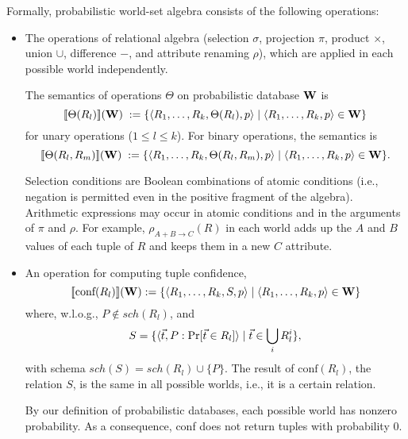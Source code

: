 Formally, probabilistic world-set algebra consists of the following operations:
\begin{itemize}
\item
The operations of relational algebra (selection $\sigma$, projection $\pi$,
product $\times$, union $\cup$, difference $-$, and attribute renaming $\rho$),
which are applied in each possible world independently.

The semantics of operations $\Theta$ on probabilistic database ${\bf W}$ is
%
\[
\lbrack\!\lbrack\Theta(R_l)\rbrack\!\rbrack({\bf W}) \; :=
\{ \langle R_1,\dots,R_k, \Theta(R_l), p \rangle
\mid \langle R_1,\dots,R_k, p \rangle \in {\bf W} \}
\]
for unary operations ($1 \le l \le k$). For binary operations, the semantics is
\[
\lbrack\!\lbrack\Theta(R_l, R_m)\rbrack\!\rbrack({\bf W}) \; :=
\{ \langle R_1,\dots,R_k, \Theta(R_l, R_m), p \rangle
\mid \langle R_1,\dots,R_k, p \rangle \in {\bf W} \}.
\]

Selection conditions are Boolean combinations of atomic
conditions (i.e., negation is permitted even in the positive fragment of the algebra).
Arithmetic expressions may occur
in atomic conditions and in the arguments of $\pi$ and $\rho$. For example,
$\rho_{A+B \rightarrow C}(R)$ in each world
adds up the $A$ and $B$ values of each tuple
of $R$ and keeps them in a new $C$ attribute.



\item
An operation for computing tuple confidence,
\[
\lbrack\!\lbrack\mbox{conf}(R_l)\rbrack\!\rbrack({\bf W}) :=
\{ \langle R_1,\dots,R_k, S, p \rangle \mid \langle R_1,\dots,R_k, p \rangle \in {\bf W} \}
\]
where, w.l.o.g., $P \not\in sch(R_l)$, and
\[
S = \{ \langle \vec{t}, P: \mbox{Pr}[\vec{t} \in R_l] \rangle \mid
   \vec{t} \in \bigcup_i R_l^i \},
\]
with schema $sch(S) = sch(R_l) \cup \{ P \}$.
%
%
The result of $\mbox{conf}(R_l)$, the relation $S$, is the same in all possible worlds, i.e., it is a certain relation.

By our definition of probabilistic databases, each possible world has nonzero probability. As a
consequence, conf does not return tuples with probability 0.


\end{itemize}
